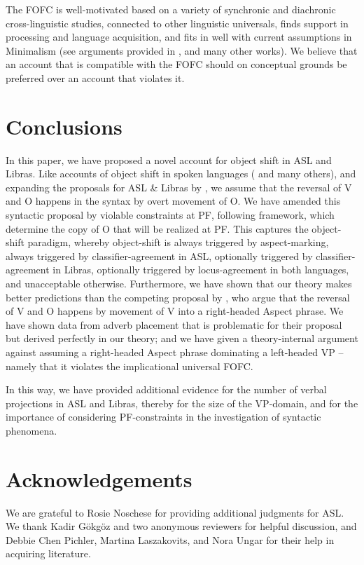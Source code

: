 \documentclass[output=paper]{langscibook}
\begin{document}
The FOFC is well-motivated based on a variety of synchronic
and diachronic cross-linguistic studies, connected to other linguistic
universals, finds support in processing and language acquisition, and
fits in well with current assumptions in Minimalism (see arguments
provided in \citealp{BiberauerHR.2014,SheehanBRH.2017}, and many other
works). We believe that an account that is compatible with the FOFC
should on conceptual grounds be preferred over an account that
violates it.

\section{Conclusions}
\label{lasz:sec:4}
\largerpage[1.5]

In this paper, we have proposed a novel account for object shift in
ASL and Libras. Like accounts of object shift in spoken languages
(\citealp{Holmberg:1986} and many others), and expanding the proposals for
ASL \& Libras by \citet{Quadros.1999,Quadros.etal.2004,Quadros.DLM.2010,Gokgoz.2013}, 
we assume that the reversal
of V and O happens in the syntax by overt movement of O. We have
amended this syntactic proposal by violable constraints at PF,
following  framework, which
determine the copy of O that will be realized at PF. This captures the
object-shift paradigm, whereby object-shift is always triggered by
aspect-marking, always triggered by classifier-agreement in ASL,
optionally triggered by classifier-agreement in Libras, optionally
triggered by locus-agreement in both languages, and unacceptable
otherwise. Furthermore, we have shown that our theory makes better
predictions than the competing proposal by 
\citet{Fischer.Janis.1992,Matsuoka.1997,Braze.2004}, 
who argue that the reversal of V
and O happens by movement of V into a right-headed Aspect phrase.
We have shown data from adverb placement that is problematic for
their proposal but derived perfectly in our theory; and we have given a
theory-internal argument against assuming a right-headed Aspect
phrase dominating a left-headed VP -- namely that it violates the
implicational universal FOFC.

In this way, we have provided additional evidence for the
number of verbal projections in ASL and Libras, thereby for the size
of the VP-domain, and for the importance of considering
PF-constraints in the investigation of syntactic phenomena.

\section*{Acknowledgements}
\largerpage[2]
We are grateful to Rosie Noschese for providing additional judgments
for ASL. We thank Kadir Gökgöz and two anonymous reviewers for
helpful discussion, and Debbie Chen Pichler, Martina Laszakovits, and
Nora Ungar for their help in acquiring literature. 

\printbibliography[heading=subbibliography,notkeyword=this]
\end{document}
